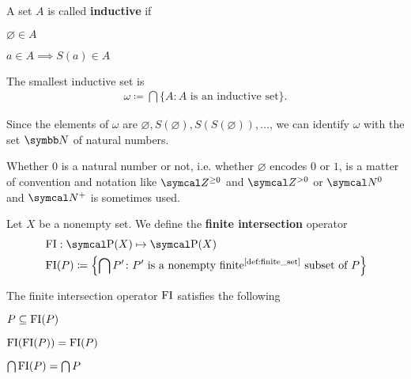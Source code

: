 \begin{definition}\label{def:inductive_set}\cite[68]{Enderton1977}
  A set \( A \) is called \textbf{inductive} if
  \begin{defenum}
    \item \( \varnothing \in A \)
    \item \( a \in A \implies S(a) \in A \)
  \end{defenum}
\end{definition}

\begin{definition}\label{def:natural_numbers_zfc}
  The smallest inductive set is
  \begin{align*}
    \omega \coloneqq \bigcap \{ A \colon A \text{ is an inductive set} \}.
  \end{align*}

  Since the elements of \( \omega \) are \( \varnothing, S(\varnothing), S(S(\varnothing)), \ldots \), we can identify \( \omega \) with the set \( \BB{N} \) of natural numbers.

  Whether \( 0 \) is a natural number or not, i.e. whether \( \varnothing \) encodes \( 0 \) or \( 1 \), is a matter of convention and notation like \( \Cal{Z}^{\geq 0} \) and \( \Cal{Z}^{>0} \) or \( \Cal{N}^0 \) and \( \Cal{N}^+ \) is sometimes used.
\end{definition}

\begin{definition}\label{def:finite_intersection_operator}
  Let \( X \) be a nonempty set. We define the \textbf{finite intersection} operator
  \begin{align*}
    &\FI: \Power(X) \mapsto \Power(X) \\
    &\FI(P) \coloneqq \left\{ \bigcap P' \colon P' \text{ is a nonempty finite\Tinyref{def:finite_set} subset of } P \right\}
  \end{align*}
\end{definition}

\begin{proposition}\label{thm:finite_intersection_properties}
  The finite intersection operator \( \operatorname{FI} \) satisfies the following
  \begin{defenum}
    \item \( P \subseteq \operatorname{FI}(P) \)
    \item \( \operatorname{FI}(\operatorname{FI}(P)) = \operatorname{FI}(P) \)
    \item \( \bigcap \operatorname{FI}(P) = \bigcap P \)
  \end{defenum}
\end{proposition}

